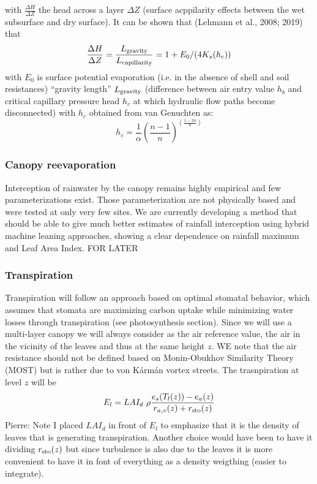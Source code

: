 \documentclass{article}
\begin{document}
with $\frac{\Delta H}{\Delta Z}$ the head across a layer $\Delta Z$ (surface acppilarity effects between the wet subsurface and dry surface). It can be shown that (Lehmann et al., 2008; 2019) that 
\begin{equation}
   \frac{\Delta H}{\Delta Z} = \frac{L_{\rm gravity}}{L_{\rm capillarity}} = 1+E_0/(4K_s(h_c))
\end{equation}
with $E_0$ is surface potential evaporation (i.e. in the absence of shell and soil resistances) “gravity length” $L_{\rm gravity}$ (difference between air entry value $h_b$ and critical capillary pressure head $h_c$ at which hydraulic flow paths become disconnected) with $h_c$ obtained from van Genuchten as:
\begin{equation}
   h_c = \frac{1}{\alpha}\left( \frac{n-1}{n} \right)^{\left( \frac{1-2n}{n} \right)}
\end{equation}

\subsubsection{Canopy reevaporation}
Interception of rainwater by the canopy remains highly empirical and few parameterizations exist. Those parameterization are not physically based and were tested at only very few sites. We are currently developing a method that should be able to give much better estimates of rainfall interception using hybrid machine leaning approaches, showing a clear dependence on rainfall maximum and Leaf Area Index. FOR LATER

\subsubsection{Transpiration}
Transpiration will follow an approach based on optimal stomatal behavior, which assumes that stomata are maximizing carbon uptake while minimizing water losses through transpiration (see photosynthesis section). 
Since we will use a multi-layer canopy we will always consider as the air reference value, the air in the vicinity of the leaves and thus at the same height $z$. WE note that the air resistance should not be defined based on Monin-Obukhov Similarity Theory (MOST) but is rather due to von Kármán vortex streets.
The trasnpiration at level $z$ will be
\begin{equation}
    E_l = LAI_d \ \rho \frac{e_s(T_l(z))-e_{a}(z)}{r_{a,v}(z)+r_{\rm sto}(z)}
\end{equation}
Pierre: Note I placed $LAI_d$ in front of $E_l$ to emphasize that it is the density of leaves that is generating transpiration. Another choice would have been to have it dividing $r_{\rm sto}(z)$ but since turbulence is also due to the leaves it is more convenient to have it in font of everything as a density weigthing (easier to integrate).
\end{document}
